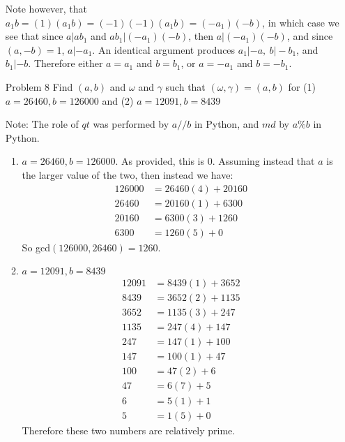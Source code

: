 \documentclass[letterpaper]{article}
\begin{document}
\begin{itemize}
            Note however, that \(a_1b = (1)(a_1b) = (-1)(-1)(a_1b) = (-a_1)(-b)\), in which case we see that since \(a | ab_1\) and \(ab_1 | (-a_1)(-b)\), then \(a | (-a_1)(-b)\), and since \((a, -b) = 1\), \(a | -a_1\). An identical argument produces \(a_1 | -a,\ b | -b_1\), and \(b_1 | -b\). Therefore either \(a = a_1\) and \(b = b_1\), or \(a = -a_1\) and \(b = -b_1\).


      \item[Problem 8] Find \((a, b)\) and \(\omega\) and \(\gamma\) such that \((\omega, \gamma) = (a,b)\) for (1) \(a = 26460, b = 126000\) and (2) \(a = 12091, b = 8439\)

            Note: The role of \(qt\) was performed by \(a // b\) in Python, and \(md\) by \(a \% b\) in Python.

            \begin{enumerate}
                  \item \(a = 26460, b = 126000\). As provided, this is 0. Assuming instead that \(a\) is the larger value of the two, then instead we have:
                        \begin{align*}
                              126000 & = 26460(4) + 20160 \\
                              26460  & = 20160(1) + 6300  \\
                              20160  & = 6300(3) + 1260   \\
                              6300   & = 1260(5) + 0
                        \end{align*}
                        So gcd\((126000, 26460) = 1260\).
                  \item \(a = 12091, b = 8439\)
                        \begin{align*}
                              12091 & = 8439(1) + 3652 \\
                              8439  & = 3652(2) + 1135 \\
                              3652  & = 1135(3) + 247  \\
                              1135  & = 247(4) + 147   \\
                              247   & = 147(1) + 100   \\
                              147   & = 100(1) + 47    \\
                              100   & = 47(2) + 6      \\
                              47    & = 6(7) + 5       \\
                              6     & = 5(1) + 1       \\
                              5     & = 1(5) + 0
                        \end{align*}
                        Therefore these two numbers are relatively prime.
            \end{enumerate}


\end{itemize}
\end{document}
